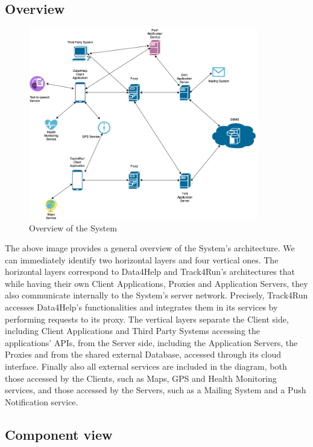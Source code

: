 \documentclass[titlepage]{article}
\begin{document}
\subsection{Overview}

\begin{figure}[H]
	\center
  	\includegraphics[width=10cm]{Overview.png}
  	\caption{Overview of the System}
 	\label{fig:OVERVIEW}
\end{figure}

The above image provides a general overview of the System’s architecture. We can immediately identify two horizontal layers and four vertical ones.
The horizontal layers correspond to Data4Help and Track4Run’s architectures that while having their own Client Applications, Proxies and Application Servers, they also communicate internally to the System’s server network. 
Precisely, Track4Run accesses Data4Help’s functionalities and integrates them in its services by performing requests to its proxy.
The vertical layers separate the Client side, including Client Applications and Third Party Systems accessing the applications’ APIs, from the Server side, including the Application Servers, the Proxies and from the shared external Database, accessed through its cloud interface.
Finally also all external services are included in the diagram, both those accessed by the Clients, such as Maps, GPS and Health Monitoring services, and those accessed by the Servers, such as a Mailing System and a Push Notification service.
\pagebreak

\subsection{Component view}
\end{document}
